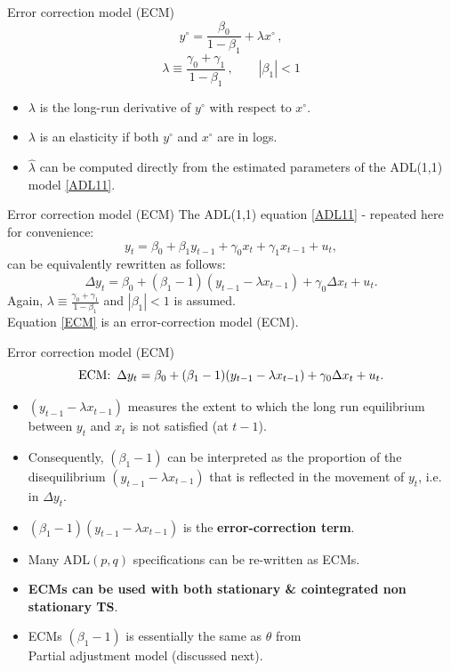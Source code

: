 \documentclass{beamer}
\begin{document}
\begin{frame}{Error correction model (ECM)}
$$ y^{\circ} =  \frac{\beta_0}{1 - \beta_1} + \lambda x^{\circ}\,,$$
$$ \lambda \equiv \frac{\gamma_0 + \gamma_1}{1 - \beta_1}\,, \qquad |\beta_1|<1$$
\begin{itemize}
\item $\lambda$ is the long-run derivative of $y^{\circ}$ with respect to $x^{\circ}$.
\medskip
\item $\lambda$ is an elasticity if both $y^{\circ}$ and $x^{\circ}$ are in logs.
\medskip
\item $\hat{\lambda}$ can be computed directly from the estimated parameters of the ADL(1,1) model \eqref{ADL11}.
\end{itemize}
\end{frame}
\begin{frame}{Error correction model (ECM)}
The ADL(1,1) equation \eqref{ADL11} - repeated here for convenience:
\begin{equation*}
y_t = \beta_0 + \beta_1 y_{t-1} + 
         \gamma_0 x_t + \gamma_1 x_{t-1} + u_t,
\end{equation*}
can be equivalently rewritten as follows:
\begin{equation} \label{ECM}
\Delta y_t = \beta_0 + (\beta_1 -1) ( y_{t-1} - \lambda x_{t-1} ) + 
         \gamma_0 \Delta x_t + u_t.
\end{equation}
Again, $ \lambda \equiv \frac{\gamma_0 + \gamma_1}{1 - \beta_1}$ and $|\beta_1| < 1$ is assumed. \\
\medskip
Equation \eqref{ECM} is an error-correction model (ECM).
\end{frame}
\begin{frame}{Error correction model (ECM)}
\begin{equation*} 
\textnormal{ECM:} \, \, \, \Delta y_t = \beta_0 + (\beta_1 -1) ( y_{t-1} - \lambda x_{t-1} ) + 
         \gamma_0 \Delta x_t + u_t.
\end{equation*}

\begin{itemize}
\item $( y_{t-1} - \lambda x_{t-1} )$ measures the extent to which the long run equilibrium between $y_t$ and $x_t$ is not satisfied (at $t-1$).
\item Consequently, $(\beta_1 -1)$ can be interpreted as the proportion of the disequilibrium $( y_{t-1} - \lambda x_{t-1} )$ that is reflected in the movement of $y_t$, i.e. in $\Delta y_t$.
\item $(\beta_1 -1)( y_{t-1} - \lambda x_{t-1} )$ is the \textbf{error-correction term}.
\item Many ADL$(p,q)$ specifications can be re-written as ECMs.
\item \textbf{ECMs can be used with both stationary \& cointegrated non stationary TS}.
\item ECMs $(\beta_1 -1)$ is essentially the same as $\theta$ from \\Partial adjustment model (discussed next).
\end{itemize}
\end{frame}
\end{document}
